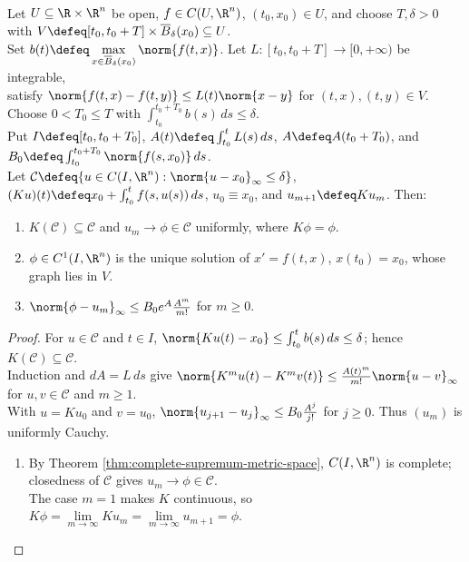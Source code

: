 \begin{theorem} \label{thm:picard-integrable-lipschitz-bound} \\
Let $U\subseteq\R\times\R^n$ be open, $f\in C(U,\R^n)$, $(t_0,x_0)\in U$, and choose $T,\delta>0$ with $V\defeq[t_0,t_0+T]\times\overline B_\delta(x_0)\subseteq U$.\\
Set $b(t)\defeq\max\limits_{x\in\overline B_\delta(x_0)}\norm{f(t,x)}$. Let $L:[t_0,t_0+T]\to[0,+\infty)$ be integrable,\\
satisfy $\norm{f(t,x)-f(t,y)}\leq L(t)\norm{x-y}$ for $(t,x),(t,y)\in V$. Choose $0<T_0\leq T$ with $\int_{t_0}^{t_0+T_0}b(s)\,ds\leq\delta$.\\
Put $I\defeq[t_0,t_0+T_0]$, $A(t)\defeq\int_{t_0}^tL(s)\,ds$, $A\defeq A(t_0+T_0)$, and $B_0\defeq\int_{t_0}^{t_0+T_0}\norm{f(s,x_0)}\,ds$.\\
Let $\mathcal C\defeq\{u\in C(I,\R^n):\norm{u-x_0}_\infty\leq\delta\}$, $(Ku)(t)\defeq x_0+\int_{t_0}^tf(s,u(s))\,ds$, $u_0\equiv x_0$, and $u_{m+1}\defeq Ku_m$. Then:
\begin{enumerate}[label=(\roman*)]
\setlength{\itemsep}{0pt}
\item $K(\mathcal C)\subseteq\mathcal C$ and $u_m\to\phi\in\mathcal C$ uniformly, where $K\phi=\phi$.
\item $\phi\in C^1(I,\R^n)$ is the unique solution of $x'=f(t,x)$, $x(t_0)=x_0$, whose graph lies in $V$.
\item $\norm{\phi-u_m}_\infty\leq B_0e^A\frac{A^m}{m!}$ for $m\geq0$.
\end{enumerate}
\begin{proof}
For $u\in\mathcal C$ and $t\in I$, $\norm{Ku(t)-x_0}\leq\int_{t_0}^tb(s)\,ds\leq\delta$; hence $K(\mathcal C)\subseteq\mathcal C$.\\
Induction and $dA=L\,ds$ give $\norm{K^mu(t)-K^mv(t)}\leq\frac{A(t)^m}{m!}\norm{u-v}_\infty$ for $u,v\in\mathcal C$ and $m\geq1$.\\
With $u=Ku_0$ and $v=u_0$, $\norm{u_{j+1}-u_j}_\infty\leq B_0\frac{A^j}{j!}$ for $j\geq0$. Thus $(u_m)$ is uniformly Cauchy.
\begin{enumerate}[label=(\roman*)]
\setlength{\itemsep}{0pt}
\item By Theorem \ref{thm:complete-supremum-metric-space}, $C(I,\R^n)$ is complete; closedness of $\mathcal C$ gives $u_m\to\phi\in\mathcal C$.\\
The case $m=1$ makes $K$ continuous, so $K\phi=\lim\limits_{m\to\infty}Ku_m=\lim\limits_{m\to\infty}u_{m+1}=\phi$.

\end{enumerate}
\end{proof}
\end{theorem}
